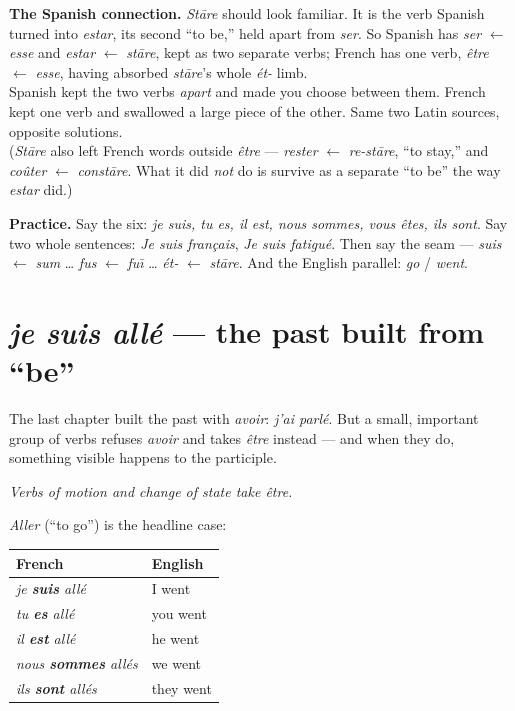 \begin{culture}
\textbf{The Spanish connection.} \emph{St\=are} should look familiar. It is the
verb Spanish turned into \emph{estar}, its second ``to be,'' held apart from
\emph{ser}. So Spanish has \emph{ser} $\leftarrow$ \emph{esse} and \emph{estar}
$\leftarrow$ \emph{st\=are}, kept as two separate verbs; French has one verb,
\emph{\^{e}tre} $\leftarrow$ \emph{esse}, having absorbed \emph{st\=are}'s whole
\emph{\'{e}t-} limb.\\[3pt]
Spanish kept the two verbs \emph{apart} and made you choose between them. French
kept one verb and swallowed a large piece of the other. Same two Latin sources,
opposite solutions.\\[3pt]
(\emph{St\=are} also left French words outside \emph{\^{e}tre} ---
\emph{rester} $\leftarrow$ \emph{re-st\=are}, ``to stay,'' and \emph{co\^{u}ter}
$\leftarrow$ \emph{const\=are}. What it did \emph{not} do is survive as a
separate ``to be'' the way \emph{estar} did.)
\end{culture}

\begin{sounds}
\textbf{Practice.} Say the six: \emph{je suis, tu es, il est, nous sommes, vous
\^{e}tes, ils sont}. Say two whole sentences: \emph{Je suis fran\c{c}ais},
\emph{Je suis fatigu\'{e}}. Then say the seam --- \emph{suis} $\leftarrow$
\emph{sum} \ldots{} \emph{fus} $\leftarrow$ \emph{fu\={\i}} \ldots{}
\emph{\'{e}t-} $\leftarrow$ \emph{st\=are}. And the English parallel:
\emph{go} / \emph{went}.
\end{sounds}

\section{\emph{je suis all\'{e}} --- the past built from ``be''}
\label{lesson:passe-compose-etre}

The last chapter built the past with \emph{avoir}: \emph{j'ai parl\'{e}}. But a
small, important group of verbs refuses \emph{avoir} and takes
\emph{\^{e}tre} instead --- and when they do, something visible happens to the
participle.

\begin{center}\itshape
Verbs of motion and change of state take \^{e}tre.
\end{center}

\emph{Aller} (``to go'') is the headline case:

\begin{center}
\begin{tabular}{@{}ll@{}}
\toprule
French & English \\
\midrule
\emph{je \textbf{suis} all\'{e}} & I went \\
\emph{tu \textbf{es} all\'{e}} & you went \\
\emph{il \textbf{est} all\'{e}} & he went \\
\emph{nous \textbf{sommes} all\'{e}s} & we went \\
\emph{ils \textbf{sont} all\'{e}s} & they went \\
\bottomrule
\end{tabular}
\end{center}

